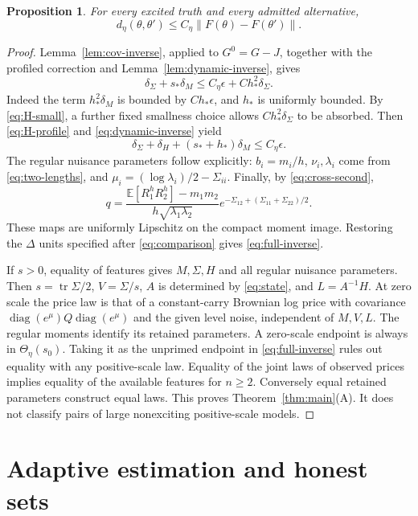 \documentclass[11pt,a4paper]{amsart}
\theoremstyle{plain}
\newtheorem{proposition}[theorem]{Proposition}
\theoremstyle{definition}
\theoremstyle{remark}
\newcommand{\EE}{\mathbb{E}}
\DeclareMathOperator{\tr}{tr}
\DeclareMathOperator{\diag}{diag}
\begin{document}
\begin{proposition}\label{prop:full-inverse}
For every excited truth and every admitted alternative,
\begin{equation}\label{eq:full-inverse}
 d_\eta(\theta,\theta')\le C_\eta\|F(\theta)-F(\theta')\|.
\end{equation}
\end{proposition}
\begin{proof}
Lemma~\ref{lem:cov-inverse}, applied to $G^0=G-J$, together with the
profiled correction and Lemma~\ref{lem:dynamic-inverse}, gives
\[
 \delta_\Sigma+s_*\delta_M
 \le C_\eta\epsilon+C h_*^2\delta_\Sigma.
\]
Indeed the term $h_*^2\delta_M$ is bounded by $C h_*\epsilon$, and $h_*$
is uniformly bounded. By \eqref{eq:H-small}, a further fixed smallness
choice allows $Ch_*^2\delta_\Sigma$ to be absorbed. Then
\eqref{eq:H-profile} and \eqref{eq:dynamic-inverse} yield
\begin{equation}\label{eq:structural-inverse}
 \delta_\Sigma+\delta_H+(s_*+h_*)\delta_M\le C_\eta\epsilon.
\end{equation}
The regular nuisance parameters follow explicitly: $b_i=m_i/h$,
$\nu_i,\lambda_i$ come from \eqref{eq:two-lengths}, and
$\mu_i=(\log\lambda_i)/2-\Sigma_{ii}$. Finally, by
\eqref{eq:cross-second},
\[
 q=\frac{\EE[R_1^hR_2^h]-m_1m_2}{h\sqrt{\lambda_1\lambda_2}}
       e^{-\Sigma_{12}+(\Sigma_{11}+\Sigma_{22})/2}.
\]
These maps are uniformly Lipschitz on the compact moment image.
Restoring the $\Delta$ units specified after \eqref{eq:comparison} gives
\eqref{eq:full-inverse}.

If $s>0$, equality of features gives $M,\Sigma,H$ and all regular
nuisance parameters. Then $s=\tr\Sigma/2$, $V=\Sigma/s$, $A$ is determined by
\eqref{eq:state}, and $L=A^{-1}H$. At zero scale the price law is that of
a constant-carry Brownian log price with covariance
$\diag(e^\mu)Q\diag(e^\mu)$ and the given level noise, independent of
$M,V,L$. The regular moments identify its retained parameters.
A zero-scale endpoint is always in $\Theta_\eta(s_0)$. Taking it as the
unprimed endpoint in \eqref{eq:full-inverse} rules out equality with
any positive-scale law. Equality of the joint laws of observed prices implies
equality of the available features for $n\ge2$. Conversely equal retained
parameters construct equal laws. This proves Theorem~\ref{thm:main}(A).
It does not classify pairs of large nonexciting positive-scale models.
\end{proof}

\section{Adaptive estimation and honest sets}\label{sec:estimation}
\end{document}

